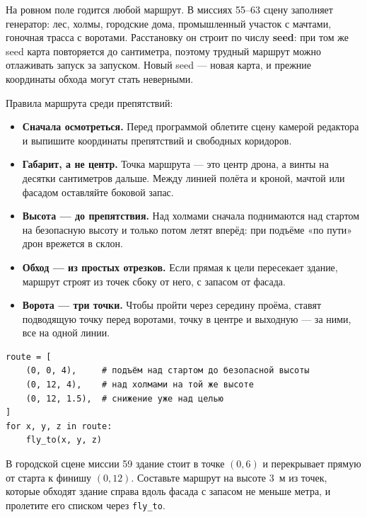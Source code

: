 На ровном поле годится любой маршрут. В миссиях 55--63 сцену заполняет генератор: лес, холмы, городские дома, промышленный участок с мачтами, гоночная трасса с воротами. Расстановку он строит по числу \textbf{seed}: при том же seed карта повторяется до сантиметра, поэтому трудный маршрут можно отлаживать запуск за запуском. Новый seed --- новая карта, и прежние координаты обхода могут стать неверными.

Правила маршрута среди препятствий:
\begin{itemize}
    \item \textbf{Сначала осмотреться.} Перед программой облетите сцену камерой редактора и выпишите координаты препятствий и свободных коридоров.
    \item \textbf{Габарит, а не центр.} Точка маршрута --- это центр дрона, а винты на десятки сантиметров дальше. Между линией полёта и кроной, мачтой или фасадом оставляйте боковой запас.
    \item \textbf{Высота --- до препятствия.} Над холмами сначала поднимаются над стартом на безопасную высоту и только потом летят вперёд: при подъёме «по пути» дрон врежется в склон.
    \item \textbf{Обход --- из простых отрезков.} Если прямая к цели пересекает здание, маршрут строят из точек сбоку от него, с запасом от фасада.
    \item \textbf{Ворота --- три точки.} Чтобы пройти через середину проёма, ставят подводящую точку перед воротами, точку в центре и выходную --- за ними, все на одной линии.
\end{itemize}

\begin{codebox}
\begin{verbatim}
route = [
    (0, 0, 4),     # подъём над стартом до безопасной высоты
    (0, 12, 4),    # над холмами на той же высоте
    (0, 12, 1.5),  # снижение уже над целью
]
for x, y, z in route:
    fly_to(x, y, z)
\end{verbatim}
\end{codebox}

\begin{taskbox}
В городской сцене миссии 59 здание стоит в точке $(0, 6)$ и перекрывает прямую от старта к финишу $(0, 12)$. Составьте маршрут на высоте 3~м из точек, которые обходят здание справа вдоль фасада с запасом не меньше метра, и пролетите его списком через \verb|fly_to|.
\end{taskbox}

